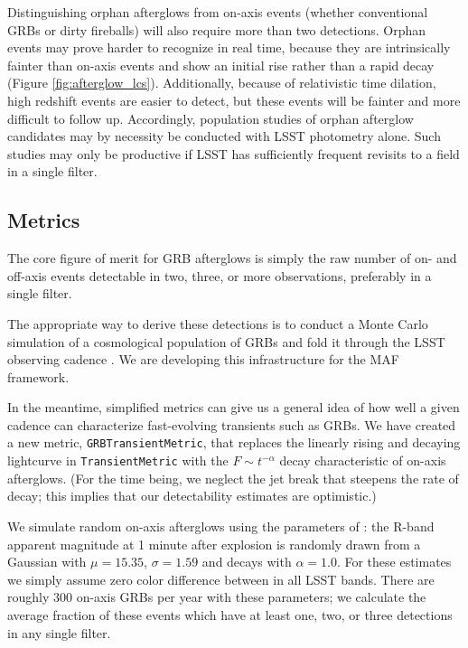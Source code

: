 Distinguishing orphan afterglows from on-axis events (whether conventional
GRBs or dirty fireballs) will also require more than two detections.
Orphan events may prove harder to recognize in real time, because they are
intrinsically fainter than on-axis events and show an initial rise rather
than a rapid decay (Figure \ref{fig:afterglow_lcs}).  Additionally, because
of relativistic time dilation, high redshift events are easier to detect,
but these events will be fainter and more difficult to follow up.
Accordingly, population studies of orphan afterglow candidates may by
necessity be conducted with LSST photometry alone.  Such studies may only
be productive if LSST has sufficiently frequent revisits to a field in a
single filter.


\subsection{Metrics}
\label{sec:\secname:metrics}

The core figure of merit for GRB afterglows is simply the raw number of
on- and off-axis events detectable in two, three, or more observations,
preferably in a single filter.

The appropriate way to derive these detections is to conduct a Monte
Carlo simulation of a cosmological population of GRBs and fold it
through the LSST observing cadence \citep[cf.][]{2011PASP..123.1034J}.
We are developing this infrastructure for the MAF framework.

In the meantime, simplified metrics can give us a general idea of how well
a given cadence can characterize fast-evolving transients such as GRBs.  We
have created a new metric, \texttt{GRBTransientMetric}, that replaces the
linearly rising and decaying lightcurve in \texttt{TransientMetric} with
the $F \sim t^{-\alpha}$ decay characteristic of on-axis afterglows.  (For
the time being, we neglect the jet break that steepens the rate of decay;
this implies that our detectability estimates are optimistic.)

We simulate random on-axis afterglows using the parameters of
\citet{2011PASP..123.1034J}: the R-band apparent magnitude at 1 minute
after explosion is randomly drawn from a Gaussian with $\mu=15.35$,
$\sigma=1.59$ and decays with $\alpha=1.0$.  For these estimates we
simply assume zero color difference between in all LSST bands.
There are roughly 300 on-axis GRBs per year with these parameters;
we calculate the average fraction of these events which have at least one,
two, or three detections in any single filter.

